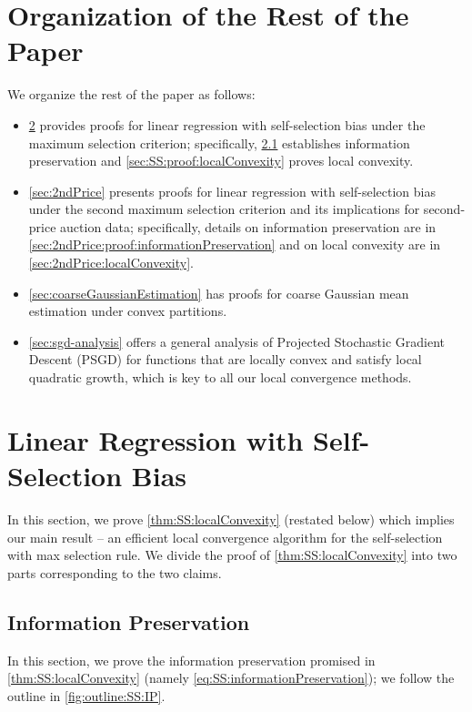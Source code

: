 \documentclass[11pt,letterpaper]{article}
\theoremstyle{plain}
\theoremstyle{definition}
\theoremstyle{remark}
\begin{document}
{{\section{Organization of the Rest of the Paper} 
We organize the rest of the paper as follows:
\begin{itemize}
    \item \cref{sec:SS} provides proofs for linear regression with self-selection bias under the maximum selection criterion; specifically,  \cref{sec:SS:proof:informationPreservation} establishes information preservation and \cref{sec:SS:proof:localConvexity} proves local convexity.
    \item \cref{sec:2ndPrice} presents proofs for linear regression with self-selection bias under the second maximum selection criterion and its implications for second-price auction data; specifically, details on information preservation are in \cref{sec:2ndPrice:proof:informationPreservation} and on local convexity are in \cref{sec:2ndPrice:localConvexity}.
    \item \cref{sec:coarseGaussianEstimation} has proofs for coarse Gaussian mean estimation under convex partitions.
    \item \cref{sec:sgd-analysis} offers a general analysis of Projected Stochastic Gradient Descent (PSGD) for functions that are locally convex and satisfy local quadratic growth, which is key to all our local convergence methods.
\end{itemize}

\section{Linear Regression with Self-Selection Bias}
\label{sec:SS}
In this section, we prove \cref{thm:SS:localConvexity} (restated below) which implies our main result -- an efficient local convergence algorithm for the self-selection with max selection rule. 
\thmSelfSelectionLocalConvexity*
\noindent We divide the proof of \cref{thm:SS:localConvexity} into two parts corresponding to the two claims.
\subsection{Information Preservation}\label{sec:SS:proof:informationPreservation}
     In this section, we prove the information preservation promised in \cref{thm:SS:localConvexity} (namely \cref{eq:SS:informationPreservation}); {we follow the outline in \cref{fig:outline:SS:IP}.}
     
}}
\end{document}

